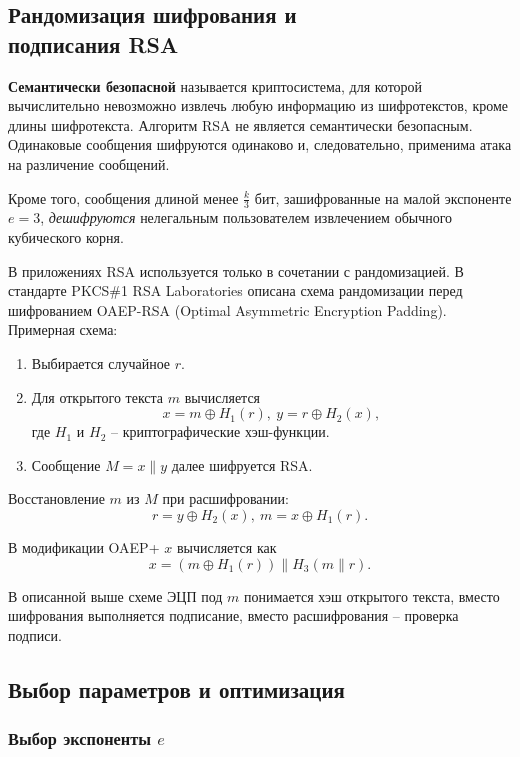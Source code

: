\subsection[Рандомизация шифрования и ЭЦП]{Рандомизация шифрования и \protect\\ подписания RSA}

\textbf{Семантически безопасной} называется криптосистема, для которой вычислительно невозможно извлечь любую информацию из шифротекстов, кроме длины шифротекста. Алгоритм RSA не является семантически безопасным. Одинаковые сообщения шифруются одинаково и, следовательно, применима атака на различение сообщений.

Кроме того, сообщения длиной менее $\frac{k}{3}$ бит, зашифрованные на малой экспоненте $e=3$, \emph{дешифруются} нелегальным пользователем извлечением обычного кубического корня.

В приложениях RSA используется только в сочетании с рандомизацией. В стандарте PKCS\#1 RSA Laboratories описана схема рандомизации перед шифрованием OAEP-RSA (Optimal Asymmetric Encryption Padding). Примерная схема:
\begin{enumerate}
    \item Выбирается случайное $r$.
    \item Для открытого текста $m$ вычисляется
        \[ x = m \oplus H_1(r), ~ y = r \oplus H_2(x), \]
        где $H_1$ и $H_2$ -- криптографические хэш-функции.
    \item Сообщение $M = x \| y$ далее шифруется RSA.
\end{enumerate}
Восстановление $m$ из $M$ при расшифровании:
    \[ r = y \oplus H_2(x), ~ m = x \oplus H_1(r). \]

В модификации OAEP+ $x$ вычисляется как
    \[ x = (m \oplus H_1(r)) \| H_3(m \| r). \]

В описанной выше схеме ЭЦП под $m$ понимается хэш открытого текста, вместо шифрования выполняется подписание, вместо расшифрования -- проверка подписи.


\subsection{Выбор параметров и оптимизация}

\subsubsection{Выбор экспоненты $e$}

